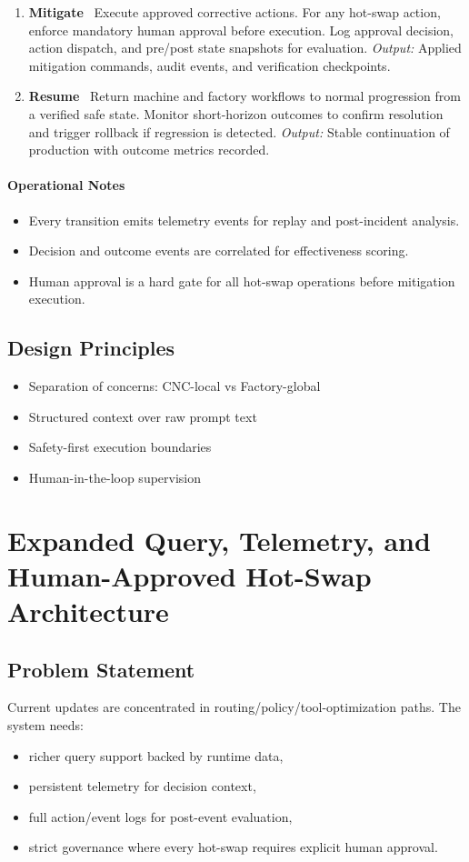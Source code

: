 \documentclass{article}
\begin{document}
\begin{enumerate}
\item \textbf{Mitigate} \
Execute approved corrective actions. For any hot-swap action, enforce mandatory human approval before execution. Log approval decision, action dispatch, and pre/post state snapshots for evaluation.
\textit{Output:} Applied mitigation commands, audit events, and verification checkpoints.

\item \textbf{Resume} \
Return machine and factory workflows to normal progression from a verified safe state. Monitor short-horizon outcomes to confirm resolution and trigger rollback if regression is detected.
\textit{Output:} Stable continuation of production with outcome metrics recorded.
\end{enumerate}

\paragraph{Operational Notes}
\begin{itemize}
\item Every transition emits telemetry events for replay and post-incident analysis.
\item Decision and outcome events are correlated for effectiveness scoring.
\item Human approval is a hard gate for all hot-swap operations before mitigation execution.
\end{itemize}



\subsection{Design Principles}
\begin{itemize}
\item Separation of concerns: CNC-local vs Factory-global
\item Structured context over raw prompt text
\item Safety-first execution boundaries
\item Human-in-the-loop supervision
\end{itemize}

\section{Expanded Query, Telemetry, and Human-Approved Hot-Swap Architecture}

\subsection{Problem Statement}
Current updates are concentrated in routing/policy/tool-optimization paths. The system needs:
\begin{itemize}
\item richer query support backed by runtime data,
\item persistent telemetry for decision context,
\item full action/event logs for post-event evaluation,
\item strict governance where every hot-swap requires explicit human approval.
\end{itemize}
\end{document}

